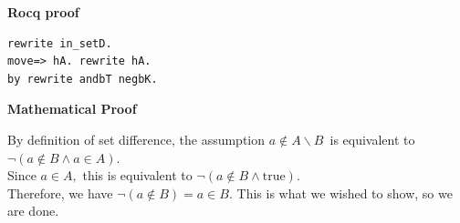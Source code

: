 \noindent
\begin{minipage}[t]{0.35\textwidth}
\textbf{Rocq proof}
\begin{verbatim}
rewrite in_setD.
move=> hA. rewrite hA.
by rewrite andbT negbK.
\end{verbatim}

\end{minipage}
\begin{minipage}[t]{0.55\textwidth}
\textbf{Mathematical Proof}
\medskip
\begin{spacing}{\dcompressedspacing}
By definition of set difference, the assumption $a \notin A \backslash B\,$ is equivalent to $\neg (a \notin B \wedge a \in A).$\\
\medskip
Since $a \in A,$ this is equivalent to $\neg(a \notin B \wedge \text{true}).$\\
\medskip
Therefore, we have $\neg(a \notin B)= a \in B.$ This is what we wished to show, so we are done.
\end{spacing}
\end{minipage}
\hfill
